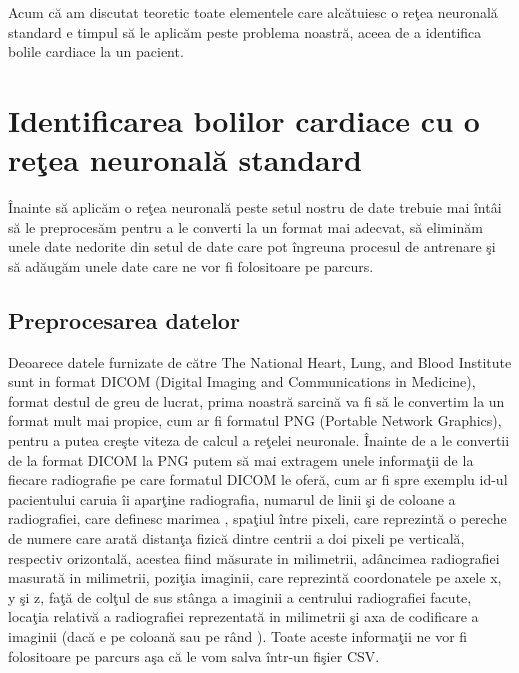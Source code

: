 \par

Acum c\u{a} am discutat teoretic toate elementele care alc\u{a}tuiesc o re\c{t}ea neuronal\u{a} standard e timpul s\u{a} le aplic\u{a}m peste problema noastr\u{a}, aceea de a identifica bolile cardiace la un pacient.

\section{Identificarea bolilor cardiace cu o re\c{t}ea neuronal\u{a} standard}

\^{I}nainte s\u{a} aplic\u{a}m o re\c{t}ea neuronal\u{a} peste setul nostru de date trebuie mai \^{i}nt\^{a}i s\u{a} le preproces\u{a}m pentru a le converti la un format mai adecvat, s\u{a} elimin\u{a}m unele date nedorite din setul de date care pot \^{i}ngreuna procesul de antrenare \c{s}i s\u{a} ad\u{a}ug\u{a}m unele date care ne vor fi folositoare pe parcurs.

\subsection{Preprocesarea datelor}

Deoarece datele furnizate de c\u{a}tre The National Heart, Lung, and Blood Institute sunt in format DICOM (Digital Imaging and Communications in Medicine), format destul de greu de lucrat, prima noastr\u{a} sarcin\u{a} va fi s\u{a} le convertim la un format mult mai propice, cum ar fi formatul PNG (Portable Network Graphics), pentru a putea cre\c{s}te viteza de calcul a re\c{t}elei neuronale. \^{I}nainte de a le convertii de la format DICOM la PNG putem s\u{a} mai extragem unele informa\c{t}ii de la fiecare radiografie pe care formatul DICOM le ofer\u{a}, cum ar fi spre exemplu  id-ul pacientului caruia \^{i}i apar\c{t}ine radiografia, numarul de linii \c{s}i de coloane a radiografiei, care definesc marimea , spa\c{t}iul \^{i}ntre pixeli, care reprezint\u{a} o pereche de numere care arat\u{a} distan\c{t}a fizic\u{a} dintre centrii a doi pixeli pe vertical\u{a}, respectiv orizontal\u{a}, acestea fiind m\u{a}surate in milimetrii, ad\^{a}ncimea radiografiei masurat\u{a} in milimetrii, pozi\c{t}ia imaginii, care reprezint\u{a} coordonatele pe axele x, y \c{s}i z, fa\c{t}\u{a} de col\c{t}ul de sus st\^{a}nga a imaginii a centrului  radiografiei facute, loca\c{t}ia relativ\u{a} a radiografiei reprezentat\u{a} in milimetrii \c{s}i axa de codificare a imaginii (dac\u{a} e pe coloan\u{a} sau pe r\^{a}nd ). Toate aceste informa\c{t}ii ne vor fi folositoare pe parcurs a\c{s}a c\u{a} le vom salva \^{i}ntr-un fi\c{s}ier CSV.

